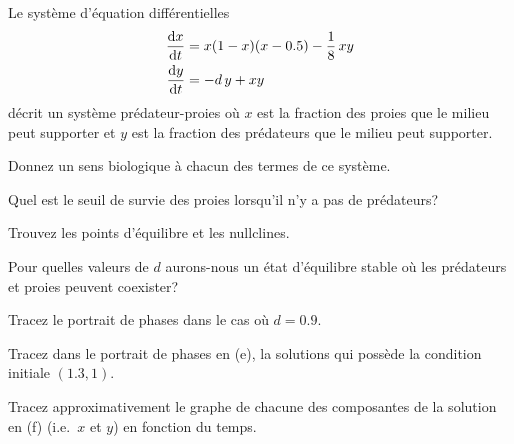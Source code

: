 \begin{question}
Le système d'équation différentielles
\begin{equation} \label{NLSquestion}
\begin{split}
\frac{\mathrm{d}x}{\mathrm{d}t} &= x(1-x)(x-0.5) - \frac{1}{8}\,xy \\
\frac{\mathrm{d}y}{\mathrm{d}t} &= -d\,y + xy
\end{split}
\end{equation}
décrit un système prédateur-proies où $x$ est la fraction des proies que le
milieu peut supporter et $y$ est la fraction des prédateurs que le milieu
peut supporter.

 Donnez un sens biologique à chacun des termes de ce système.

 Quel est le seuil de survie des proies lorsqu'il n'y a pas de
prédateurs?

 Trouvez les points d'équilibre et les nullclines.

 Pour quelles valeurs de $d$ aurons-nous un état d'équilibre stable
où les prédateurs et proies peuvent coexister?

 Tracez le portrait de phases dans le cas où $d=0.9$.

 Tracez dans le portrait de phases en (e), la solutions
qui possède la condition initiale $(1.3, 1)$.

 Tracez approximativement le graphe de chacune des composantes de la
solution en (f) (i.e.\ $x$ et $y$) en fonction du temps. 
\label{18Q5}
\end{question}

